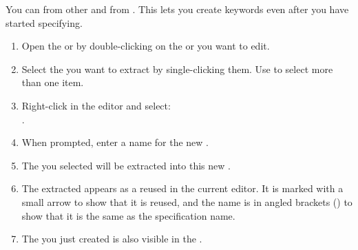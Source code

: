 
You can  \gdcases{} from other \gdcases{} and from \gdsuites{}. This lets you create keywords even after you have started specifying. 

\begin{enumerate}
\item Open the \gdtestcaseeditor{} or \gdtestsuiteeditor{} by double-clicking on the \gdcase{} or \gdsuite{} you  want to edit. 
\item Select the \gdcases{} you want to extract by single-clicking them. Use 
   to select more than one item. 
\item Right-click in the editor and  select: \\
.
\item When prompted, enter a name for the new \gdcase{}. 
\item The \gdcases{} you selected will be extracted into this new \gdcase{}. 
\item The extracted \gdcase{} appears as a reused \gdcase{} in the current editor. It is marked with a small arrow to show that it is reused, and the \gdcase{} name is in angled brackets (\bxshell{< >}) to show that it is the same as the specification name. 
\item The \gdcase{} you just created is also visible in the \gdtestcasebrowser{}. 
\end{enumerate}
